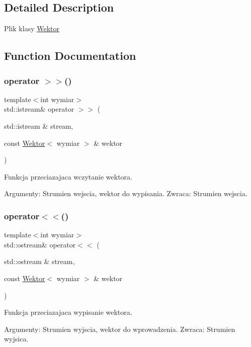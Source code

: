 \subsection{Detailed Description}
Plik klasy \mbox{\hyperlink{class_wektor}{Wektor}} 

\subsection{Function Documentation}
\mbox{\label{_wektor_8hh_abf2432e4e296349d9fc00d99d2d5afd4}} 
\subsubsection{\texorpdfstring{operator $>$$>$()}{operator >>()}}
{\footnotesize\ttfamily template$<$int wymiar$>$ \\
std\+::istream\& operator $>$$>$ (\begin{DoxyParamCaption}\item[{std\+::istream \&}]{stream,  }\item[{const \mbox{\hyperlink{class_wektor}{Wektor}}$<$ wymiar $>$ \&}]{wektor }\end{DoxyParamCaption})\hspace{0.3cm}{\ttfamily [inline]}}



Funkcja przeciazajaca wczytanie wektora. 

Argumenty\+: Strumien wejscia, wektor do wypisania. Zwraca\+: Strumien wejscia. \mbox{\label{_wektor_8hh_a5e31ef6f7e06a11a2747548f8bd2b80e}} 
\subsubsection{\texorpdfstring{operator$<$$<$()}{operator<<()}}
{\footnotesize\ttfamily template$<$int wymiar$>$ \\
std\+::ostream\& operator$<$$<$ (\begin{DoxyParamCaption}\item[{std\+::ostream \&}]{stream,  }\item[{const \mbox{\hyperlink{class_wektor}{Wektor}}$<$ wymiar $>$ \&}]{wektor }\end{DoxyParamCaption})\hspace{0.3cm}{\ttfamily [inline]}}



Funkcja przeciazajaca wypisanie wektora. 

Argumenty\+: Strumien wyjscia, wektor do wprowadzenia. Zwraca\+: Strumien wyjsica. 